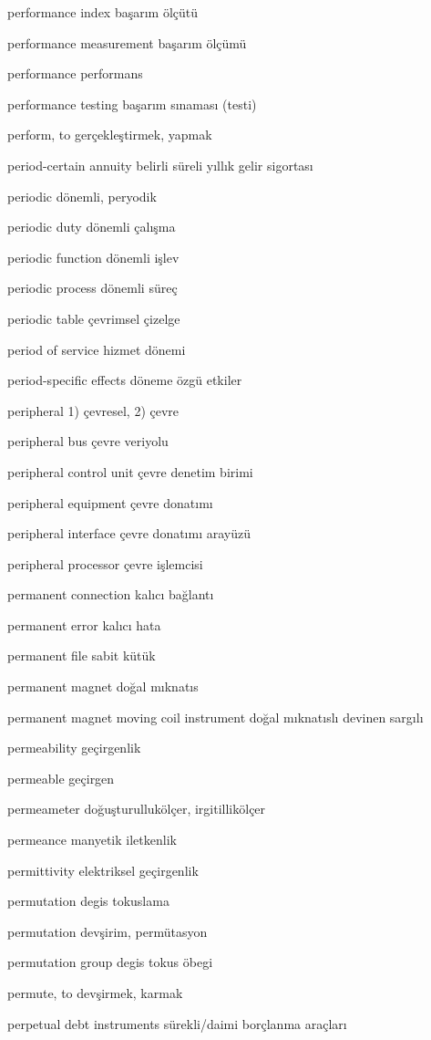 \documentclass[12pt,fleqn]{article}\usepackage{../../common}
\begin{document}
performance index başarım ölçütü

performance measurement başarım ölçümü

performance performans

performance testing başarım sınaması (testi)

perform, to gerçekleştirmek, yapmak

period-certain annuity belirli süreli yıllık gelir sigortası

periodic dönemli, peryodik

periodic duty dönemli çalışma

periodic function dönemli işlev

periodic process dönemli süreç

periodic table çevrimsel çizelge

period of service hizmet dönemi

period-specific effects döneme özgü etkiler

peripheral 1) çevresel, 2) çevre

peripheral bus çevre veriyolu

peripheral control unit çevre denetim birimi

peripheral equipment çevre donatımı

peripheral interface çevre donatımı arayüzü

peripheral processor çevre işlemcisi

permanent connection kalıcı bağlantı

permanent error kalıcı hata

permanent file sabit kütük

permanent magnet doğal mıknatıs

permanent magnet moving coil instrument doğal mıknatıslı devinen sargılı

permeability geçirgenlik

permeable geçirgen

permeameter doğuşturullukölçer, irgitillikölçer

permeance manyetik iletkenlik

permittivity elektriksel geçirgenlik

permutation degis tokuslama

permutation devşirim, permütasyon

permutation group degis tokus öbegi

permute, to devşirmek, karmak

perpetual debt instruments sürekli/daimi borçlanma araçları
\end{document}
